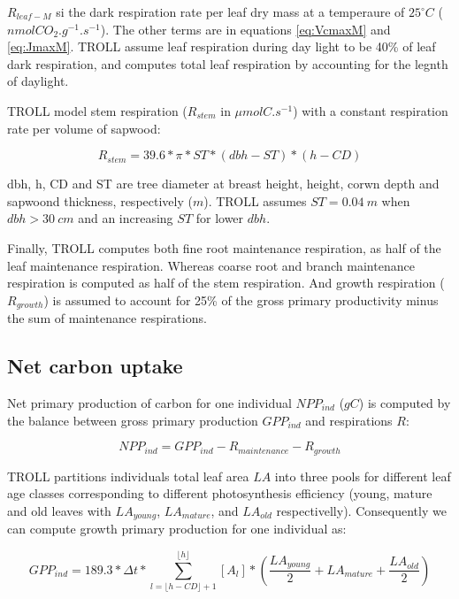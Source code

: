 \documentclass[12pt,]{article}
\theoremstyle{definition}
\theoremstyle{definition}
\theoremstyle{remark}
\begin{document}
\(R_{leaf-M}\) si the dark respiration rate per leaf dry mass at a
temperaure of \(25^\circ C\) (\(nmolCO_2.g^{-1}.s^{-1}\)). The other
terms are in equations \eqref{eq:VcmaxM} and \eqref{eq:JmaxM}. TROLL assume
leaf respiration during day light to be 40\% of leaf dark respiration,
and computes total leaf respiration by accounting for the legnth of
daylight.

TROLL model stem respiration (\(R_{stem}\) in \(\mu molC.s^{-1}\)) with
a constant respiration rate per volume of sapwood:

\begin{equation}
  R_{stem} = 39.6*\pi*ST*(dbh-ST)*(h-CD)
  \label{eq:Rs}
\end{equation}

dbh, h, CD and ST are tree diameter at breast height, height, corwn
depth and sapwoond thickness, respectively (\(m\)). TROLL assumes
\(ST=0.04~m\) when \(dbh>30~cm\) and an increasing \(ST\) for lower
\(dbh\).

Finally, TROLL computes both fine root maintenance respiration, as half
of the leaf maintenance respiration. Whereas coarse root and branch
maintenance respiration is computed as half of the stem respiration. And
growth respiration (\(R_{growth}\)) is assumed to account for 25\% of
the gross primary productivity minus the sum of maintenance
respirations.

\subsection{Net carbon uptake}\label{net-carbon-uptake}

Net primary production of carbon for one individual \(NPP_{ind}\)
(\(gC\)) is computed by the balance between gross primary production
\(GPP_{ind}\) and respirations \(R\):

\begin{equation}
  NPP_{ind} = GPP_{ind} - R_{maintenance} - R_{growth}
  \label{eq:NPP}
\end{equation}

TROLL partitions individuals total leaf area \(LA\) into three pools for
different leaf age classes corresponding to different photosynthesis
efficiency (young, mature and old leaves with \(LA_{young}\),
\(LA_{mature}\), and \(LA_{old}\) respectivelly). Consequently we can
compute growth primary production for one individual as:

\begin{equation}
  GPP_{ind} = 189.3 * \Delta t * \sum _{l= \lfloor h-CD \rfloor +1} ^{\lfloor h \rfloor} [A_l] * (\frac{LA_{young}}{2} + LA_{mature} + \frac{LA_{old}}{2})
  \label{eq:GPP}
\end{equation}
\end{document}
